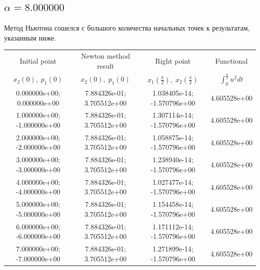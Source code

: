 \documentclass[titlepage]{article}
\def\l{\left}
\def\r{\right}
\begin{document}
\subsection{$\alpha = 8.000000$} 
Метод Ньютона сошелся с большого количества начальных точек к результатам, указанным ниже. \\ 
\begin{tabular}{ | c | c | c | c |} 
\hline 
Initial point  & Newton method result & Right point & Functional 
 \\ $x_2(0), \; p_1(0)$ & $x_2(0), \; p_1(0)$ & $x_1\l(\frac{\pi}{2}\r), \; x_2\l(\frac{\pi}{2}\r)$ & $\int_{0}^{\frac{\pi}{2}}u^2dt$  \\ \hline 
0.000000e+00; 0.000000e+00 & 7.884326e-01; 3.705512e+00 & 1.038405e-14; -1.570796e+00 & 4.605528e+00 \\ \hline 
1.000000e+00; -1.000000e+00 & 7.884326e-01; 3.705512e+00 & 1.307114e-14; -1.570796e+00 & 4.605528e+00 \\ \hline 
2.000000e+00; -2.000000e+00 & 7.884326e-01; 3.705512e+00 & 1.058875e-14; -1.570796e+00 & 4.605528e+00 \\ \hline 
3.000000e+00; -3.000000e+00 & 7.884326e-01; 3.705512e+00 & 1.238940e-14; -1.570796e+00 & 4.605528e+00 \\ \hline 
4.000000e+00; -4.000000e+00 & 7.884326e-01; 3.705512e+00 & 1.027477e-14; -1.570796e+00 & 4.605528e+00 \\ \hline 
5.000000e+00; -5.000000e+00 & 7.884326e-01; 3.705512e+00 & 1.154458e-14; -1.570796e+00 & 4.605528e+00 \\ \hline 
6.000000e+00; -6.000000e+00 & 7.884326e-01; 3.705512e+00 & 1.171112e-14; -1.570796e+00 & 4.605528e+00 \\ \hline 
7.000000e+00; -7.000000e+00 & 7.884326e-01; 3.705512e+00 & 1.271899e-14; -1.570796e+00 & 4.605528e+00 \\ \hline 
\end{tabular} 
\end{document}
